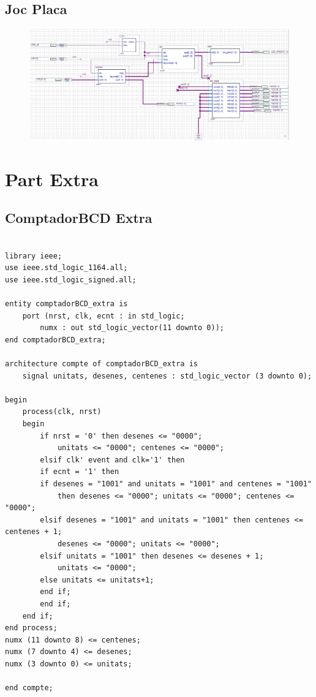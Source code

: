 \documentclass[12pt, a4papre]{article}
\begin{document}
		
	\subsection{Joc Placa}
	
	
	
				\begin{figure}[H]
		\begin{center}
		\includegraphics[width=130mm]{jocPlaca.jpeg}
		\end{center}
	\end{figure}	



\section{Part Extra}

\subsection{ComptadorBCD Extra}

	\begin{lstlisting}[style=vhdl, frame=single, basicstyle=\tiny]

library ieee;
use ieee.std_logic_1164.all;
use ieee.std_logic_signed.all;

entity comptadorBCD_extra is
	port (nrst, clk, ecnt : in std_logic;
		numx : out std_logic_vector(11 downto 0));
end comptadorBCD_extra;

architecture compte of comptadorBCD_extra is 
	signal unitats, desenes, centenes : std_logic_vector (3 downto 0);
	
begin 
	process(clk, nrst)
	begin
	    if nrst = '0' then desenes <= "0000";
			unitats <= "0000"; centenes <= "0000";
	    elsif clk' event and clk='1' then
		if ecnt = '1' then
		if desenes = "1001" and unitats = "1001" and centenes = "1001" 
			then desenes <= "0000"; unitats <= "0000"; centenes <= "0000";
		elsif desenes = "1001" and unitats = "1001" then centenes <= centenes + 1;
			desenes <= "0000"; unitats <= "0000";
		elsif unitats = "1001" then desenes <= desenes + 1;
			unitats <= "0000";
		else unitats <= unitats+1;
		end if;
	    end if;
	end if;
end process;
numx (11 downto 8) <= centenes;
numx (7 downto 4) <= desenes;
numx (3 downto 0) <= unitats;

end compte;

		\end{lstlisting}
		
\end{document}
